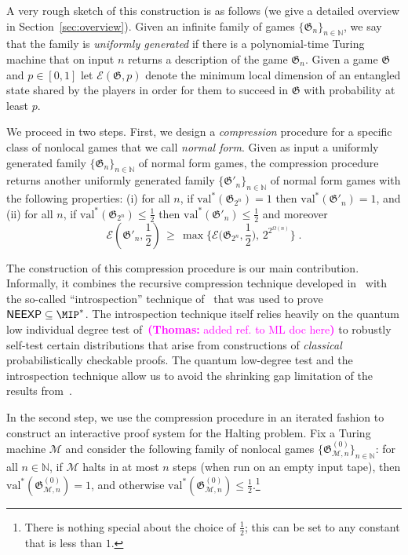 \documentclass[11pt]{article}
\theoremstyle{definition}
\newcommand{\N}{\ensuremath{\mathbb{N}}}
\newcommand{\cM}{\ensuremath{\mathcal{M}}}
\newcommand{\val}{\ensuremath{\mathrm{val}}}
\newcommand{\game}{\mathfrak{G}}
\newcommand{\class}[1]{\ensuremath{\mathsf{#1}}\xspace}
\newcommand{\NEEXP}{\class{NEEXP}} \newcommand{\NEEEXP}{\class{NEEEXP}}
\newcommand{\Ent}{\mathscr{E}}
\newcommand{\tnote}[1]{\textcolor{magenta}{\small {\textbf{(Thomas:} #1\textbf{)
      }}}}
\newcommand{\tnote}[1]{}
\begin{document}
A very rough sketch of this construction is as follows (we give a detailed overview in Section~\ref{sec:overview}). Given an infinite family of games $\{ \game_n \}_{n \in \N}$, we say that the family is \emph{uniformly generated} if there is a polynomial-time Turing machine that on input $n$ returns a description of the game $\game_n$. Given a game $\game$ and $p\in[0,1]$ let $\Ent(\game,p)$ denote the minimum local dimension of an entangled state shared by the players in order for them to succeed in $\game$ with probability at least $p$. 

We proceed in two steps. First, we design a \emph{compression} procedure for a specific class of nonlocal games that we call \emph{normal form}. Given as input a uniformly generated family $\{ \game_{n} \}_{n \in \N}$ of normal form games, the compression procedure returns another uniformly generated family $\{\game'_{n}\}_{n \in \N}$ of normal form games with the following properties: (i) for all $n$, if $\val^*(\game_{2^n})=1$ then $\val^*(\game'_n)=1$, and (ii) for all $n$, if $\val^*(\game_{2^n})\leq \frac{1}{2}$ then $\val^*(\game'_n)\leq \frac{1}{2}$ and moreover
\[ \Ent(\game'_{n},\frac{1}{2})\,\geq\, \max \Big\{ \Ent\Big(\game_{2^n},\frac{1}{2}\Big), \,2^{2^{\Omega(n)}} \Big\}\;.\] 

The construction of this compression procedure is our main contribution. Informally, it combines the recursive compression technique developed in~\cite{ji2017compression,fitzsimons2018quantum} with the so-called ``introspection'' technique of~\cite{NW19} that was used to prove $\NEEXP \subseteq \MIP^*$. The introspection technique itself relies heavily on the quantum low individual degree test of~\cite{natarajan2018low,ML20}\tnote{added ref. to ML doc here} to robustly self-test certain distributions that arise from constructions of \emph{classical} probabilistically checkable proofs. The quantum low-degree test and the introspection technique allow us to avoid the shrinking gap limitation of the results from~\cite{fitzsimons2018quantum}. 




In the second step, we use the compression procedure in an iterated fashion to construct an interactive proof system for the Halting problem. Fix a Turing machine $\cM$ and consider the following family  of nonlocal games $\{\game_{\cM,n}^{(0)}\}_{n\in\N}$: for all $n \in \N$, if $\cM$ halts in at most $n$ steps (when run on an empty input tape), then $\val^*(\game_{\cM,n}^{(0)})=1$, and otherwise  $\val^*(\game_{\cM,n}^{(0)}) \leq \frac{1}{2}$.\footnote{There is nothing special about the choice of $\frac{1}{2}$; this can be set to any constant that is less than $1$.} 
\end{document}
